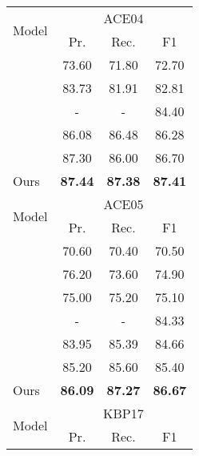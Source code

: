 \documentclass[11pt,a4paper]{article}
\begin{document}
\begin{table}[t]
\centering
\small
\begin{tabular}{lccc}
\toprule
\multirow{2}{*}{Model}   & \multicolumn{3}{c}{ACE04}  \\
 \cmidrule(lr){2-4} 
& Pr.  & Rec. & F1  \\
\midrule

\citet{katiyar-cardie-2018-nested} 
&  73.60 &  71.80 &  72.70 \\
\citet{shibuya-hovy-2020-nested}   & 83.73 & 81.91 & 82.81\\
\citet{strakova-etal-2019-neural}  & - & - &  84.40  \\
\citet{wang-etal-2020-pyramid}       & 86.08  & 86.48  & 86.28     \\
\citet{yu-etal-2020-named}       & 87.30  & 86.00  & 86.70     \\
\midrule
Ours    & \textbf{87.44}  & \textbf{87.38}  & \textbf{87.41}  \\
\bottomrule
\toprule
\multirow{2}{*}{Model}   & \multicolumn{3}{c}{ACE05}  \\
 \cmidrule(lr){2-4} 
& Pr.  & Rec. & F1  \\
\midrule








\citet{katiyar-cardie-2018-nested}  & 70.60 & 70.40 & 70.50 \\
\citet{lin-etal-2019-sequence}       & 76.20  & 73.60 & 74.90  \\
\citet{luo-zhao-2020-bipartite}       & 75.00  & 75.20  & 75.10    \\
\citet{strakova-etal-2019-neural}  & - & - &  84.33  \\
\citet{wang-etal-2020-pyramid}       & 83.95  & 85.39  & 84.66     \\
\citet{yu-etal-2020-named}       & 85.20  & 85.60  & 85.40     \\
\midrule
Ours    & \textbf{86.09}   & \textbf{87.27} & \textbf{86.67}  \\

\bottomrule
\toprule
\multirow{2}{*}{Model}   & \multicolumn{3}{c}{KBP17}  \\
 \cmidrule(lr){2-4} 
& Pr.  & Rec. & F1  \\
\midrule




\end{tabular}
\end{table}
\end{document}
